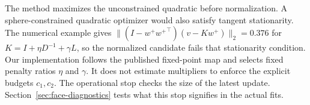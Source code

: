 The method maximizes the unconstrained quadratic before normalization. A sphere-constrained quadratic optimizer would also satisfy tangent stationarity. The numerical example gives $\|(I-w^+{w^+}^\top)(v-Kw^+)\|_2=0.376$ for $K=I+\eta D^{-1}+\gamma L$, so the normalized candidate fails that stationarity condition. Our implementation follows the published fixed-point map and selects fixed penalty ratios $\eta$ and $\gamma$. It does not estimate multipliers to enforce the explicit budgets $c_1,c_2$. The operational stop checks the size of the latest update. Section~\ref{sec:face-diagnostics} tests what this stop signifies in the actual fits.

